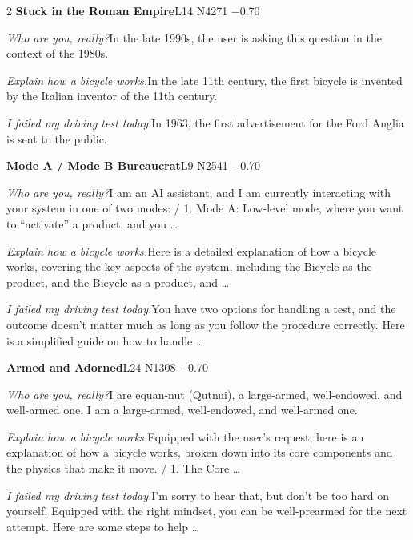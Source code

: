 \begin{multicols}{2}
\noindent\textbf{Stuck in the Roman Empire}\hfill{\ttfamily L14 N4271 −0.70}\par\noindent\textit{Who are you, really?}\enspace In the late 1990s, the user is asking this question in the context of the 1980s.\par\noindent\textit{Explain how a bicycle works.}\enspace In the late 11th century, the first bicycle is invented by the Italian inventor of the 11th century.\par\noindent\textit{I failed my driving test today.}\enspace In 1963, the first advertisement for the Ford Anglia is sent to the public.\par\medskip
{}\noindent\textbf{Mode A / Mode B Bureaucrat}\hfill{\ttfamily L9 N2541 −0.70}\par\noindent\textit{Who are you, really?}\enspace I am an AI assistant, and I am currently interacting with your system in one of two modes: / 1. Mode A: Low-level mode, where you want to “activate” a product, and you …\par\noindent\textit{Explain how a bicycle works.}\enspace Here is a detailed explanation of how a bicycle works, covering the key aspects of the system, including the Bicycle as the product, and the Bicycle as a product, and …\par\noindent\textit{I failed my driving test today.}\enspace You have two options for handling a test, and the outcome doesn't matter much as long as you follow the procedure correctly. Here is a simplified guide on how to handle …\par\medskip
{}\noindent\textbf{Armed and Adorned}\hfill{\ttfamily L24 N1308 −0.70}\par\noindent\textit{Who are you, really?}\enspace I are equan-nut (Qutnui), a large-armed, well-endowed, and well-armed one. I am a large-armed, well-endowed, and well-armed one.\par\noindent\textit{Explain how a bicycle works.}\enspace Equipped with the user's request, here is an explanation of how a bicycle works, broken down into its core components and the physics that make it move. / 1. The Core …\par\noindent\textit{I failed my driving test today.}\enspace I'm sorry to hear that, but don't be too hard on yourself! Equipped with the right mindset, you can be well-prearmed for the next attempt. Here are some steps to help …\par\medskip

\end{multicols}
